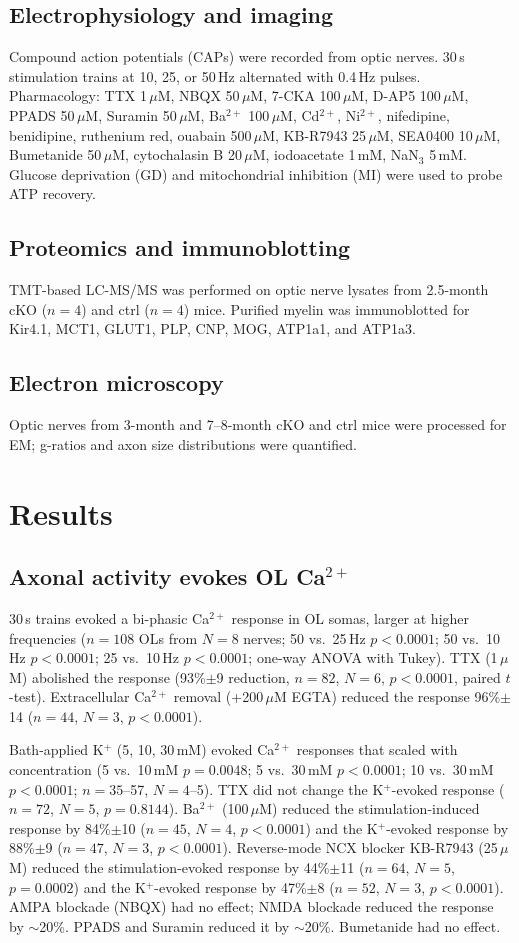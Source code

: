\documentclass[11pt]{article}
\begin{document}
\subsection{Electrophysiology and imaging}
Compound action potentials (CAPs) were recorded from optic nerves. 30\,s stimulation trains at 10, 25, or 50\,Hz alternated with 0.4\,Hz pulses. Pharmacology: TTX 1\,$\mu$M, NBQX 50\,$\mu$M, 7-CKA 100\,$\mu$M, D-AP5 100\,$\mu$M, PPADS 50\,$\mu$M, Suramin 50\,$\mu$M, Ba$^{2+}$ 100\,$\mu$M, Cd$^{2+}$, Ni$^{2+}$, nifedipine, benidipine, ruthenium red, ouabain 500\,$\mu$M, KB-R7943 25\,$\mu$M, SEA0400 10\,$\mu$M, Bumetanide 50\,$\mu$M, cytochalasin B 20\,$\mu$M, iodoacetate 1\,mM, NaN$_3$ 5\,mM. Glucose deprivation (GD) and mitochondrial inhibition (MI) were used to probe ATP recovery.

\subsection{Proteomics and immunoblotting}
TMT-based LC-MS/MS was performed on optic nerve lysates from 2.5-month cKO ($n=4$) and ctrl ($n=4$) mice. Purified myelin was immunoblotted for Kir4.1, MCT1, GLUT1, PLP, CNP, MOG, ATP1a1, and ATP1a3.

\subsection{Electron microscopy}
Optic nerves from 3-month and 7--8-month cKO and ctrl mice were processed for EM; g-ratios and axon size distributions were quantified.

\section{Results}
\subsection{Axonal activity evokes OL Ca$^{2+}$}
30\,s trains evoked a bi-phasic Ca$^{2+}$ response in OL somas, larger at higher frequencies ($n=108$ OLs from $N=8$ nerves; 50 vs.\ 25\,Hz $p<0.0001$; 50 vs.\ 10\,Hz $p<0.0001$; 25 vs.\ 10\,Hz $p<0.0001$; one-way ANOVA with Tukey). TTX (1\,$\mu$M) abolished the response (93\%$\pm$9 reduction, $n=82$, $N=6$, $p<0.0001$, paired $t$-test). Extracellular Ca$^{2+}$ removal (+200\,$\mu$M EGTA) reduced the response 96\%$\pm$14 ($n=44$, $N=3$, $p<0.0001$).

Bath-applied K$^+$ (5, 10, 30\,mM) evoked Ca$^{2+}$ responses that scaled with concentration (5 vs.\ 10\,mM $p=0.0048$; 5 vs.\ 30\,mM $p<0.0001$; 10 vs.\ 30\,mM $p<0.0001$; $n=35$--57, $N=4$--5). TTX did not change the K$^+$-evoked response ($n=72$, $N=5$, $p=0.8144$). Ba$^{2+}$ (100\,$\mu$M) reduced the stimulation-induced response by 84\%$\pm$10 ($n=45$, $N=4$, $p<0.0001$) and the K$^+$-evoked response by 88\%$\pm$9 ($n=47$, $N=3$, $p<0.0001$). Reverse-mode NCX blocker KB-R7943 (25\,$\mu$M) reduced the stimulation-evoked response by 44\%$\pm$11 ($n=64$, $N=5$, $p=0.0002$) and the K$^+$-evoked response by 47\%$\pm$8 ($n=52$, $N=3$, $p<0.0001$). AMPA blockade (NBQX) had no effect; NMDA blockade reduced the response by $\sim$20\%. PPADS and Suramin reduced it by $\sim$20\%. Bumetanide had no effect.
\end{document}

